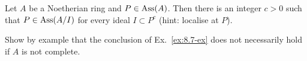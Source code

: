\begin{exercise}\label{ex:8.9-ex}
Let $A$ be a Noetherian ring and $P \in \operatorname{Ass}(A)$. Then there is an integer $c > 0$
such that $P \in \operatorname{Ass}(A/I)$ for every ideal $I \subset P^c$ (hint: localise at $P$).
\end{exercise}

\begin{exercise}\label{ex:8.10-ex}
Show by example that the conclusion of Ex.~\ref{ex:8.7-ex} does not necessarily hold
if $A$ is not complete.
\end{exercise}
